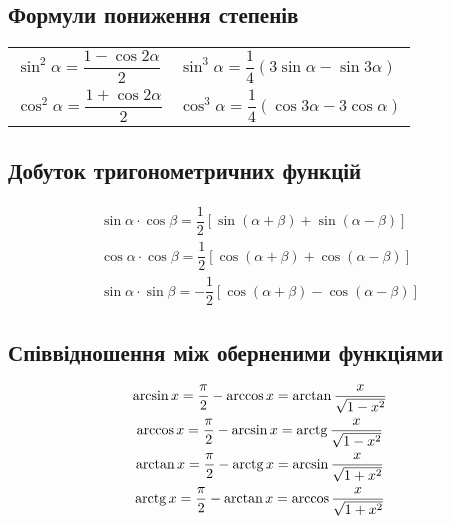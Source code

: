 \subsection{Формули пониження степенів}
{\renewcommand{\arraystretch}{2.5}
\begin{tabu}{X[c]X[c]}
$\sin^{2}\alpha=\dfrac{1-\cos2\alpha}{2}$ & $\sin^{3}\alpha=\dfrac{1}{4}\left(3\sin\alpha-\sin3\alpha\right)$\\
$\cos^{2}\alpha=\dfrac{1+\cos2\alpha}{2}$ & $\cos^{3}\alpha=\dfrac{1}{4}\left(\cos3\alpha-3\cos\alpha\right)$
\end{tabu}}
\subsection{Добуток тригонометричних функцій}
\begin{gather*}
\sin\alpha\cdot\cos\beta=\dfrac{1}{2}\left[\sin(\alpha+\beta)+\sin(\alpha-\beta)\right]\\
\cos\alpha\cdot\cos\beta=\dfrac{1}{2}\left[\cos(\alpha+\beta)+\cos(\alpha-\beta)\right]\\
\sin\alpha\cdot\sin\beta=-\dfrac{1}{2}\left[\cos(\alpha+\beta)-\cos(\alpha-\beta)\right]
\end{gather*}
\subsection{Співвідношення між оберненими функціями}
\begin{gather*}
\arcsin{x}=\dfrac{\pi}{2}-\arccos{x}=\arctan{\dfrac{x}{\sqrt{1-x^2}}}\\
\arccos{x}=\dfrac{\pi}{2}-\arcsin{x}=\operatorname{arctg}{\dfrac{x}{\sqrt{1-x^2}}}\\
\arctan{x}=\dfrac{\pi}{2}-\operatorname{arctg}{x}=\arcsin{\dfrac{x}{\sqrt{1+x^2}}}\\
\operatorname{arctg}{x}=\dfrac{\pi}{2}-\arctan{x}=\arccos{\dfrac{x}{\sqrt{1+x^2}}}
\end{gather*}
